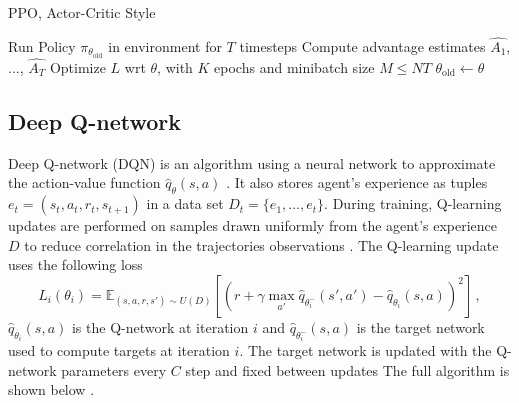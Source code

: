 \begin{algorithm}
	\caption{PPO, Actor-Critic Style}\label{algorithm:ppo}
	\begin{algorithmic}
			\State Run Policy $\pi_{\theta_\text{old}}$ in environment for $T$ timesteps
			\State Compute advantage estimates $\hat{A_1}$, ..., $\hat{A_T}$
		\EndFor
		\State Optimize $L$ wrt $\theta$, with $K$ epochs and minibatch size $M \leq NT$
		\State $\theta_{\text{old}} \gets \theta$
	\EndFor
\end{algorithmic}
\end{algorithm}

\subsection{Deep Q-network}

Deep Q-network (DQN) is an algorithm using a neural network to approximate the action-value function $\hat{q}_\theta(s, a)$ \cite{mnih2015human}. It also stores agent's experience as tuples $e_t = (s_t, a_t, r_t, s_{t+1})$ in a data set $D_t = \{e_1, ..., e_t\}$. During training, Q-learning updates are performed on samples drawn uniformly from the agent's experience $D$ to reduce correlation in the trajectories observations \cite{mnih2015human}. The Q-learning update uses the following loss \cite{mnih2015human}
\begin{equation}
	L_i(\theta_i) = \mathbb{E}_{(s,a,r,s') \sim U(D)} \left [\left ( r + \gamma \max_{a'}\hat{q}_{\theta^-_i}(s',a') -\hat{q}_{\theta_i}(s,a) \right )^2 \right ] \, ,
\end{equation}
$\hat{q}_{\theta_i}(s,a)$ is the Q-network at iteration $i$ and $\hat{q}_{\theta^-_i}(s,a)$ is the target network used to compute targets at iteration $i$. The target network is updated with the Q-network parameters every $C$ step and fixed between updates The full algorithm is shown below \cite{mnih2015human}.

